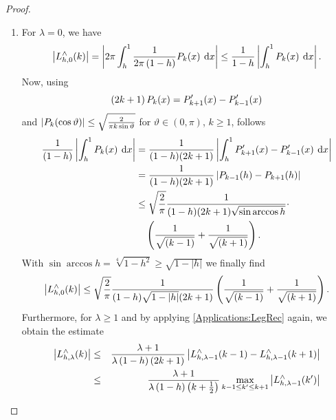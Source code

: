 \begin{proof}${}^{}$\\[-3.5ex]
  \begin{enumerate}
  \item For $\lambda = 0$, we have
    \begin{equation*}
      \left|L_{h,0}^{\wedge}{\hspace{-0.4ex}}\left(k\right)\right| 
      = \left\vert2\pi \int_{h}^1 \frac{1}{2\pi\left(1-h\right)} P_{k}{\hspace{-0.4ex}}\left(x\right) \: \text{\rm{d}} x\right\vert 
      \le \frac{1}{1-h}\left\vert\int_{h}^1 P_{k}{\hspace{-0.4ex}}\left(x\right) \: \text{\rm{d}} x\right\vert.
    \end{equation*}
    Now, using 
    \begin{equation}
      \label{Applications:LegRec}
      \left(2k+1\right) P_{k}{\hspace{-0.4ex}}\left(x\right) = P_{k+1}'{\hspace{-0.4ex}}\left(x\right) - P_{k-1}'{\hspace{-0.4ex}}\left(x\right)
    \end{equation}
    and 
    $\left|P_{k}{\hspace{-0.4ex}}\left(\cos\vartheta\right)\right| \le \sqrt{\frac{2}{\pi k \sin\vartheta}}$ 
    for $\vartheta \in (0,\pi)$, $k \ge 1$, follows
    \begin{align*}
      \frac{1}{(1-h)}\left\vert\int_{h}^1 P_{k}{\hspace{-0.4ex}}\left(x\right) \: \text{\rm{d}} x\right\vert
      & = \frac{1}{(1-h)(2k+1)}
          \left\vert\int_{h}^1 P_{k+1}'{\hspace{-0.4ex}}\left(x\right) - P_{k-1}'{\hspace{-0.4ex}}\left(x\right) \: \text{\rm{d}} x\right\vert\\
      & = \frac{1}{(1-h)(2k+1)}
          \left\vert P_{k-1}{\hspace{-0.4ex}}\left(h\right) - P_{k+1}{\hspace{-0.4ex}}\left(h\right)\right\vert\\
      & \le \sqrt{\frac{2}{\pi}}\frac{1}{(1-h)(2k+1)
            \sqrt{\sin\arccos h}} \cdot \\
      & \quad \left(\frac{1}{\sqrt{(k-1)}} + \frac{1}{\sqrt{(k+1)}}\right).
    \end{align*}
    With $\sin\arccos h = \sqrt[4]{1-h^2} \ge \sqrt{1-|h|}$ we finally find
    \begin{equation}
      \label{SmallLambda}
      \left|L_{h,0}^{\wedge}{\hspace{-0.4ex}}\left(k\right)\right| \le 
      \sqrt{\frac{2}{\pi}}\frac{1}{(1-h)\sqrt{1-|h|}(2k+1)}
      \left(\frac{1}{\sqrt{(k-1)}} + \frac{1}{\sqrt{(k+1)}}\right).
    \end{equation}
    Furthermore, for $\lambda \ge 1$ and by applying \eqref{Applications:LegRec} again, 
    we obtain the estimate
    \begin{eqnarray*}
      \left|\fun{L_{h,\lambda}^{\wedge}}{k}\right| &\le&
      \frac{\lambda+1}{\lambda\left(1-h\right)\left(2k+1\right)}
      \left|\fun{L_{h,\lambda-1}^{\wedge}}{k-1}-
        \fun{L_{h,\lambda-1}^{\wedge}}{k+1}\right|\\ &\le&
      \frac{\lambda+1}{\lambda\left(1-h\right)\left(k+\frac{1}{2}\right)}
      \max\limits_{k-1\le k'\le k+1}
      \left|\fun{L_{h,\lambda-1}^{\wedge}}{k'}\right|

\end{eqnarray*}
\end{enumerate}
\end{proof}

